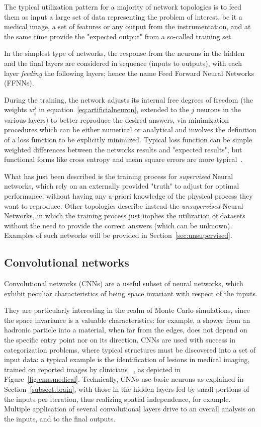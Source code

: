 The typical utilization pattern for a majority of network topologies is to feed them as input a large set of data representing the problem of interest, be it a medical image, a set of features or any output from the instrumentation, and at the same time provide the "expected output" from a so-called training set. 

In the simplest type of networks, the response from the neurons in the hidden and the final layers are considered in sequence (inputs to outputs), with each layer \emph{feeding} the following layers; hence the name Feed Forward Neural Networks (FFNNs).

During the training, the network adjusts its internal free degrees of freedom (the weights $w_i^j$ in equation~\ref{eq:artificialneuron}, extended to the $j$ neurons in the various layers) to better reproduce the desired answers, via minimization procedures which can be either numerical or analytical and involves the definition of a loss function to be explicitly minimized. Typical loss function can be simple weighted differences between the networks results and "expected results", but functional forms like cross entropy and mean square errors are more typical~\cite{lossfunctions}.

What has just been described is the training process for \emph{supervised} Neural networks, which rely on an externally provided "truth" to adjust for optimal performance, without having any a-priori knowledge of the physical process they want to reproduce.
Other topologies describe instead the \emph{unsupervised} Neural Networks, in which the training process just implies the utilization of datasets without the need to provide the correct answers (which can be unknown). Examples of such networks will be provided in Section~\ref{sec:unsupervised}.

\subsection{Convolutional networks}
Convolutional networks (CNNs) are a useful subset of neural networks, which exhibit peculiar characteristics of being space invariant with respect of the inputs.

They are particularly interesting in the realm of Monte Carlo simulations, since the space invariance is a valuable characteristics: for example, a shower from an hadronic particle into a material, when far from the edges, does not depend on the specific entry point nor on its direction.
CNNs are used with success in categorization problems, where typical structures must be discovered into a set of input data: a typical example is the identification of lesions in medical imaging, trained on reported images by clinicians ~\cite{cnnmedical}, as depicted in Figure~\ref{fig:cnnsmedical}.
Technically, CNNs use basic neurons as explained in Section~\ref{subsect:brain}, with those in the hidden layers fed by small portions of the inputs per iteration, thus realizing spatial independence, for example. Multiple application of several convolutional layers drive to an overall analysis on the inputs, and to the final outputs.

